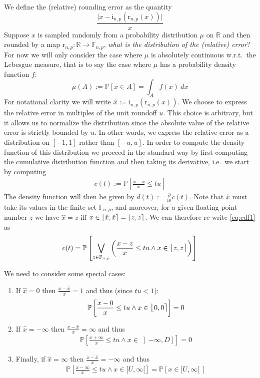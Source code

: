 \documentclass[10pt,a4paper]{article}
\theoremstyle{plain}
\theoremstyle{definition}
\newcommand{\ie}{i.e.\ }
\newcommand{\wrt}{w.r.t.\ }
\newcommand{\F}[1][n,p]{\mathbb{F}_{#1}}
\newcommand{\R}{\mathbb{R}}
\newcommand{\Rep}[1][n,p]{\mathrm{i}_{#1}}
\newcommand{\Round}[1][n,p]{\mathrm{r}_{#1}}
\newcommand{\fintvl}[1][x]{\mathlarger{\lfloor}#1,#1\mathlarger{\rceil}}
\newcommand{\absv}[1]{\vert #1\vert}
\newcommand{\Pro}[1]{\mathbb{P}\left[ #1 \right]}
\newcommand{\dt}{\frac{\partial}{\partial t}}
\begin{document}
We define the (relative) rounding error as the quantity
\[
\frac{\absv{x-\Rep(\Round(x))}}{x}
\]
Suppose $x$ is sampled randomly from a probability distribution $\mu$ on $\R$ and then rounded by a map $\Round:\R\to\F$, \emph{what is the distribution of the (relative) error}? For now we will only consider the case where $\mu$ is absolutely continuous \wrt the Lebesgue measure, that is to say the case where $\mu$ has a probability density function $f$:
\[
\mu(A):=\Pro{x\in A}=\int_Af(x)~dx
\]
For notational clarity we will write $\hat{x}:=\Rep(\Round(x))$. We choose to express the relative error in multiples of the unit roundoff $u$. This choice is arbitrary, but it allows us to normalize the distribution since the absolute value of the relative error is strictly bounded by $u$. In other words, we express the relative error as a distribution on $[-1,1]$ rather than $[-u,u]$. In order to compute the density function of this distribution we proceed in the standard way by first computing the cumulative distribution function and then taking its derivative, \ie we start by computing
\begin{align}\label{eq:cdf1}
c(t):=\Pro{\frac{x-\hat{x}}{x}\leq tu}
\end{align}
The density function will then be given by $d(t):=\dt c(t)$. Note that $\hat{x}$ must take its values in the finite set $\F$, and moreover, for a given floating point number $z$ we have $\hat{x}=z$ iff $x\in \fintvl[\hat{x}]=\fintvl[z]$. We can therefore re-write \eqref{eq:cdf1} as
\begin{align}\label{eq:cdf2}
c(t)=\Pro{\bigvee_{z\in\F}\left(\frac{x-z}{x}\leq tu\wedge x\in \fintvl[z]\right)}
\end{align}

We need to consider some special cases:
\begin{enumerate}
\item If $\hat{x}=0$ then $\frac{x-\hat{x}}{x}=1$ and thus (since $tu<1$):
\begin{align}\label{eq:cdfnot0}
\Pro{\frac{x-0}{x}\leq tu\wedge x\in \fintvl[0]}=0
\end{align}
\item If $\hat{x}=-\infty$ then $\frac{x-\hat{x}}{x}=\infty$ and thus 
\begin{align}\label{eq:cdfnotminf}
\Pro{\frac{x+\infty}{x}\leq tu\wedge x\in \left]-\infty,D\right]}=0
\end{align}
\item Finally, if $\hat{x}=\infty$ then $\frac{x-\hat{x}}{x}=-\infty$ and thus 
\begin{align}\label{eq:cdfpinf}
\Pro{\frac{x-\infty}{x}\leq tu\wedge x\in [U,\infty[}=\Pro{x\in [U,\infty[~}
\end{align}
\end{enumerate}
\end{document}
